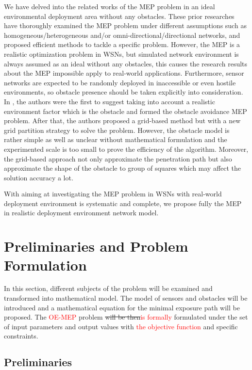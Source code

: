 \documentclass[final]{elsarticle}
\begin{document}
We have delved into the related works of the MEP problem in an ideal environmental deployment area without any obstacles. These prior researches have thoroughly examined the MEP problem under different assumptions such as homogeneous/heterogeneous and/or omni-directional/directional networks, and proposed efficient methods to tackle a specific problem. However, the MEP is a realistic optimization problem in WSNs, but simulated network environment is always assumed as an ideal without any obstacles, this causes the research results about the MEP impossible apply to real-world applications. Furthermore, sensor networks are expected to be randomly deployed in inaccessible or even hostile environments, so obstacle presence should be taken explicitly into consideration. In \cite{liu2017obstacle}, the authors were the first to suggest taking into account a realistic environment factor which is the obstacle and formed the obstacle avoidance MEP problem. After that, the authors proposed a grid-based method but with a new grid partition strategy to solve the problem. However, the obstacle model is rather simple as well as unclear without mathematical formulation and the experimented scale is too small to prove the efficiency of the algorithm. Moreover, the grid-based approach not only approximate the penetration path but also approximate the shape of the obstacle to group of squares which may affect the solution accuracy a lot.

With aiming at investigating the MEP problem in WSNs with real-world deployment environment is systematic and complete, we propose fully the MEP in realistic deployment environment network model. 
\section{Preliminaries and Problem Formulation}
In this section, different subjects of the problem will be examined and transformed into mathematical model. The model of sensors and obstacles will be introduced and a mathematical equation for the minimal exposure path will be proposed. The \textcolor{red}{OE-MEP} problem \sout{will be then}\textcolor{red}{is formally} formulated under the set of input parameters and output values with \textcolor{red}{the objective function} and specific constraints.
\subsection{Preliminaries}
\end{document}
